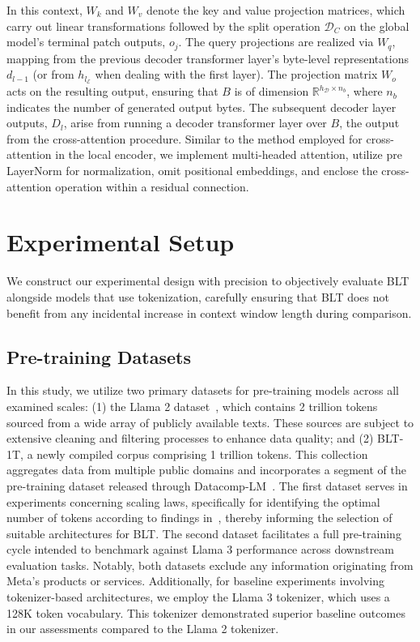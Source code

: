 In this context, $W_k$ and $W_v$ denote the key and value projection matrices, which carry out linear transformations followed by the split operation $\mathcal{D}_C$ on the global model’s terminal patch outputs, $o_j$. The query projections are realized via $W_q$, mapping from the previous decoder transformer layer’s byte-level representations $d_{l-1}$ (or from $h_{l_{\mathcal{E}}}$ when dealing with the first layer). The projection matrix $W_o$ acts on the resulting output, ensuring that $B$ is of dimension $\mathbb{R}^{h_{\mathcal{D}} \times n_b}$, where $n_b$ indicates the number of generated output bytes. The subsequent decoder layer outputs, $D_l$, arise from running a decoder transformer layer over $B$, the output from the cross-attention procedure. Similar to the method employed for cross-attention in the local encoder, we implement multi-headed attention, utilize pre LayerNorm for normalization, omit positional embeddings, and enclose the cross-attention operation within a residual connection. 

\section{Experimental Setup}
\label{section:experiments}
We construct our experimental design with precision to objectively evaluate {\textsc BLT} alongside models that use tokenization, carefully ensuring that {\textsc BLT} does not benefit from any incidental increase in context window length during comparison.

\subsection{Pre-training Datasets} In this study, we utilize two primary datasets for pre-training models across all examined scales: (1) the Llama 2 dataset~\citep{touvron2023llama}, which contains 2 trillion tokens sourced from a wide array of publicly available texts. These sources are subject to extensive cleaning and filtering processes to enhance data quality; and (2) {\textsc BLT}-1T, a newly compiled corpus comprising 1 trillion tokens. This collection aggregates data from multiple public domains and incorporates a segment of the pre-training dataset released through Datacomp-LM~\citep{li2024datacomp}. The first dataset serves in experiments concerning scaling laws, specifically for identifying the optimal number of tokens according to findings in~\cite{dubey2024llama}, thereby informing the selection of suitable architectures for {\textsc BLT}. The second dataset facilitates a full pre-training cycle intended to benchmark against Llama 3 performance across downstream evaluation tasks. Notably, both datasets exclude any information originating from Meta's products or services. Additionally, for baseline experiments involving tokenizer-based architectures, we employ the Llama 3 tokenizer, which uses a 128K token vocabulary. This tokenizer demonstrated superior baseline outcomes in our assessments compared to the Llama 2 tokenizer.

